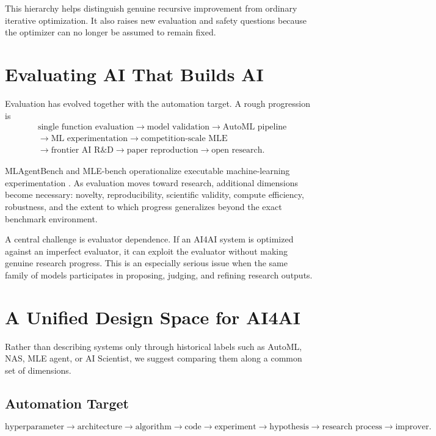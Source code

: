 \documentclass[journal]{IEEEtran}
\begin{document}
This hierarchy helps distinguish genuine recursive improvement from ordinary iterative optimization. It also raises new evaluation and safety questions because the optimizer can no longer be assumed to remain fixed.

\section{Evaluating AI That Builds AI}
\label{sec:evaluation}

Evaluation has evolved together with the automation target. A rough progression is
\begin{equation*}
\begin{split}
&\text{single function evaluation}\rightarrow\text{model validation}\rightarrow\text{AutoML pipeline}\\
&\rightarrow\text{ML experimentation}\rightarrow\text{competition-scale MLE}\\
&\rightarrow\text{frontier AI R\&D}\rightarrow\text{paper reproduction}\rightarrow\text{open research}.
\end{split}
\end{equation*}

MLAgentBench and MLE-bench operationalize executable machine-learning experimentation \cite{huang2024mlagentbench,chan2025mlebench}. As evaluation moves toward research, additional dimensions become necessary: novelty, reproducibility, scientific validity, compute efficiency, robustness, and the extent to which progress generalizes beyond the exact benchmark environment.

A central challenge is evaluator dependence. If an AI4AI system is optimized against an imperfect evaluator, it can exploit the evaluator without making genuine research progress. This is an especially serious issue when the same family of models participates in proposing, judging, and refining research outputs.

\section{A Unified Design Space for AI4AI}
\label{sec:designspace}

Rather than describing systems only through historical labels such as AutoML, NAS, MLE agent, or AI Scientist, we suggest comparing them along a common set of dimensions.

\subsection{Automation Target}
\begin{equation*}
\text{hyperparameter}\rightarrow\text{architecture}\rightarrow\text{algorithm}\rightarrow\text{code}\rightarrow\text{experiment}\rightarrow\text{hypothesis}\rightarrow\text{research process}\rightarrow\text{improver}.
\end{equation*}
\end{document}
